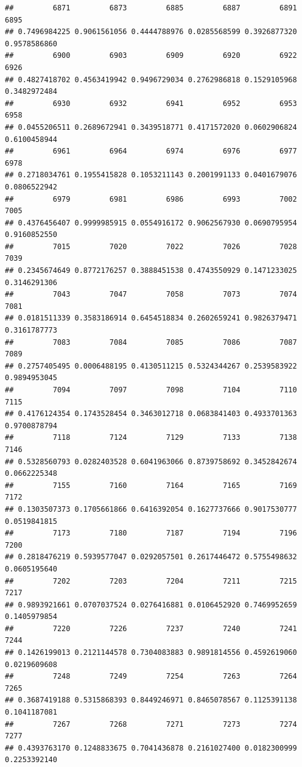 \documentclass[
]{article}
\begin{document}
\begin{verbatim}
##         6871         6873         6885         6887         6891         6895 
## 0.7496984225 0.9061561056 0.4444788976 0.0285568599 0.3926877320 0.9578586860 
##         6900         6903         6909         6920         6922         6926 
## 0.4827418702 0.4563419942 0.9496729034 0.2762986818 0.1529105968 0.3482972484 
##         6930         6932         6941         6952         6953         6958 
## 0.0455206511 0.2689672941 0.3439518771 0.4171572020 0.0602906824 0.6100458944 
##         6961         6964         6974         6976         6977         6978 
## 0.2718034761 0.1955415828 0.1053211143 0.2001991133 0.0401679076 0.0806522942 
##         6979         6981         6986         6993         7002         7005 
## 0.4376456407 0.9999985915 0.0554916172 0.9062567930 0.0690795954 0.9160852550 
##         7015         7020         7022         7026         7028         7039 
## 0.2345674649 0.8772176257 0.3888451538 0.4743550929 0.1471233025 0.3146291306 
##         7043         7047         7058         7073         7074         7081 
## 0.0181511339 0.3583186914 0.6454518834 0.2602659241 0.9826379471 0.3161787773 
##         7083         7084         7085         7086         7087         7089 
## 0.2757405495 0.0006488195 0.4130511215 0.5324344267 0.2539583922 0.9894953045 
##         7094         7097         7098         7104         7110         7115 
## 0.4176124354 0.1743528454 0.3463012718 0.0683841403 0.4933701363 0.9700878794 
##         7118         7124         7129         7133         7138         7146 
## 0.5328560793 0.0282403528 0.6041963066 0.8739758692 0.3452842674 0.0662225348 
##         7155         7160         7164         7165         7169         7172 
## 0.1303507373 0.1705661866 0.6416392054 0.1627737666 0.9017530777 0.0519841815 
##         7173         7180         7187         7194         7196         7200 
## 0.2818476219 0.5939577047 0.0292057501 0.2617446472 0.5755498632 0.0605195640 
##         7202         7203         7204         7211         7215         7217 
## 0.9893921661 0.0707037524 0.0276416881 0.0106452920 0.7469952659 0.1405979854 
##         7220         7226         7237         7240         7241         7244 
## 0.1426199013 0.2121144578 0.7304083883 0.9891814556 0.4592619060 0.0219609608 
##         7248         7249         7254         7263         7264         7265 
## 0.3687419188 0.5315868393 0.8449246971 0.8465078567 0.1125391138 0.1041187081 
##         7267         7268         7271         7273         7274         7277 
## 0.4393763170 0.1248833675 0.7041436878 0.2161027400 0.0182300999 0.2253392140 

\end{verbatim}
\end{document}
